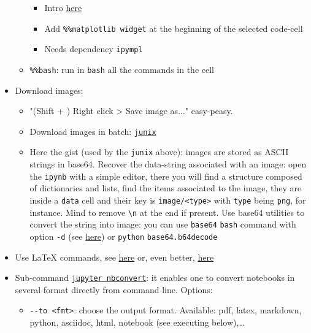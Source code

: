 \documentclass[a4paper,12pt,%
              final%
              ]{article}
\begin{document}
\begin{itemize}
\begin{itemize}
        \begin{itemize}
          \item Intro \href{https://matplotlib.org/stable/users/explain/figure/interactive.html#ipython-integration}{here}
          \item Add \verb|%%matplotlib widget| at the beginning of the selected code-cell
          \item Needs dependency \texttt{ipympl}
        \end{itemize}
      \item \verb|%%bash|: run in \texttt{bash} all the commands in the cell
    \end{itemize}
  \item Download images:
    \begin{itemize}
      \item "(Shift + ) Right click > Save image as..." easy-peasy.
      \item Download images in batch: \href{https://github.com/damienmarlier51/JupyterNotebookImageExporter}{\texttt{junix}}
      \item Here the gist (used by the \texttt{junix} above): images are stored as ASCII strings in base64. Recover the data-string associated with an image: open the \texttt{ipynb} with a simple editor, there you will find a structure composed of dictionaries and lists, find the items associated to the image, they are inside a \texttt{data} cell and their key is \texttt{image/<type>} with \texttt{type} being \texttt{png}, for instance. Mind to remove \verb|\n| at the end if present. Use base64 utilities to convert the string into image: you can use \texttt{base64} \texttt{bash} command with option \verb|-d| (see \href{https://askubuntu.com/questions/907540/how-to-decode-an-image-string-using-base64-in-command-line}{here}) or \texttt{python} \verb|base64.b64decode|
    \end{itemize}
  \item Use \LaTeX{} commands, see \href{https://stackoverflow.com/questions/13208286/how-to-write-latex-in-ipython-notebook}{here} or, even better, \href{https://jupyterbook.org/content/math.html}{here}
  \item Sub-command \href{https://nbconvert.readthedocs.io/en/latest/usage.html}{\texttt{jupyter nbconvert}}: it enables one to convert notebooks in several format directly from command line. Options:
    \begin{itemize}
      \item \verb|--to <fmt>|: choose the output format. Available: pdf, latex, markdown, python, asciidoc, html, notebook (see executing below),\ldots

\end{itemize}
\end{itemize}
\end{document}
